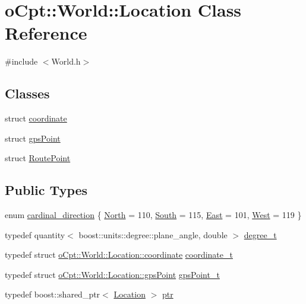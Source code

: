 \hypertarget{classo_cpt_1_1_world_1_1_location}{}\section{o\+Cpt\+:\+:World\+:\+:Location Class Reference}
\label{classo_cpt_1_1_world_1_1_location}


{\ttfamily \#include $<$World.\+h$>$}

\subsection*{Classes}
\begin{DoxyCompactItemize}
\item 
struct \hyperlink{structo_cpt_1_1_world_1_1_location_1_1coordinate}{coordinate}
\item 
struct \hyperlink{structo_cpt_1_1_world_1_1_location_1_1gps_point}{gps\+Point}
\item 
struct \hyperlink{structo_cpt_1_1_world_1_1_location_1_1_route_point}{Route\+Point}
\end{DoxyCompactItemize}
\subsection*{Public Types}
\begin{DoxyCompactItemize}
\item 
enum \hyperlink{classo_cpt_1_1_world_1_1_location_aa37d99a87b49ccc38470dcc6cc64ced5}{cardinal\+\_\+direction} \{ \hyperlink{classo_cpt_1_1_world_1_1_location_aa37d99a87b49ccc38470dcc6cc64ced5ac706574c1e2fcd94ec86cc17851b848b}{North} = 110, 
\hyperlink{classo_cpt_1_1_world_1_1_location_aa37d99a87b49ccc38470dcc6cc64ced5a6380581e8856626370ef7e28b88ff8c9}{South} = 115, 
\hyperlink{classo_cpt_1_1_world_1_1_location_aa37d99a87b49ccc38470dcc6cc64ced5a429b1917d3bf9c2f75eb55d30a0a2e20}{East} = 101, 
\hyperlink{classo_cpt_1_1_world_1_1_location_aa37d99a87b49ccc38470dcc6cc64ced5a362e85ccd8384db96571b670ad2d20a6}{West} = 119
 \}
\item 
typedef quantity$<$ boost\+::units\+::degree\+::plane\+\_\+angle, double $>$ \hyperlink{classo_cpt_1_1_world_1_1_location_a896d36a393f64f80cb4756134477da14}{degree\+\_\+t}
\item 
typedef struct \hyperlink{structo_cpt_1_1_world_1_1_location_1_1coordinate}{o\+Cpt\+::\+World\+::\+Location\+::coordinate} \hyperlink{classo_cpt_1_1_world_1_1_location_ade9263a17c41b7af085dfcb9055b18f3}{coordinate\+\_\+t}
\item 
typedef struct \hyperlink{structo_cpt_1_1_world_1_1_location_1_1gps_point}{o\+Cpt\+::\+World\+::\+Location\+::gps\+Point} \hyperlink{classo_cpt_1_1_world_1_1_location_a3aa5e31e2888b4da40ad534b99473888}{gps\+Point\+\_\+t}
\item 
typedef boost\+::shared\+\_\+ptr$<$ \hyperlink{classo_cpt_1_1_world_1_1_location}{Location} $>$ \hyperlink{classo_cpt_1_1_world_1_1_location_a33b7d6b8797958b6e4d792dfeaa6d160}{ptr}
\end{DoxyCompactItemize}
